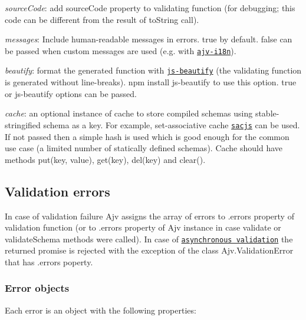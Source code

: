 \begin{DoxyItemize}
\item {\itshape source\+Code}\+: add {\ttfamily source\+Code} property to validating function (for debugging; this code can be different from the result of to\+String call).
\item {\itshape messages}\+: Include human-\/readable messages in errors. {\ttfamily true} by default. {\ttfamily false} can be passed when custom messages are used (e.\+g. with \href{https://github.com/epoberezkin/ajv-i18n}{\tt ajv-\/i18n}).
\item {\itshape beautify}\+: format the generated function with \href{https://github.com/beautify-web/js-beautify}{\tt js-\/beautify} (the validating function is generated without line-\/breaks). {\ttfamily npm install js-\/beautify} to use this option. {\ttfamily true} or js-\/beautify options can be passed.
\item {\itshape cache}\+: an optional instance of cache to store compiled schemas using stable-\/stringified schema as a key. For example, set-\/associative cache \href{https://github.com/epoberezkin/sacjs}{\tt sacjs} can be used. If not passed then a simple hash is used which is good enough for the common use case (a limited number of statically defined schemas). Cache should have methods {\ttfamily put(key, value)}, {\ttfamily get(key)}, {\ttfamily del(key)} and {\ttfamily clear()}.
\end{DoxyItemize}

\subsection*{Validation errors}

In case of validation failure Ajv assigns the array of errors to {\ttfamily .errors} property of validation function (or to {\ttfamily .errors} property of Ajv instance in case {\ttfamily validate} or {\ttfamily validate\+Schema} methods were called). In case of \href{#asynchronous-validation}{\tt asynchronous validation} the returned promise is rejected with the exception of the class {\ttfamily Ajv.\+Validation\+Error} that has {\ttfamily .errors} poperty.

\subsubsection*{Error objects}

Each error is an object with the following properties\+:


